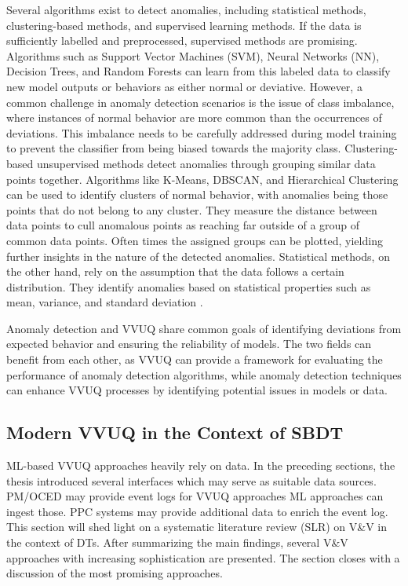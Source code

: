 Several algorithms exist to detect anomalies, including statistical methods, clustering-based methods, and supervised learning methods. If the data is sufficiently labelled and preprocessed, supervised methods are promising. Algorithms such as Support Vector Machines (SVM), Neural Networks (NN), Decision Trees, and Random Forests can learn from this labeled data to classify new model outputs or behaviors as either normal or deviative. However, a common challenge in anomaly detection scenarios is the issue of class imbalance, where instances of normal behavior are more common than the occurrences of deviations. This imbalance needs to be carefully addressed during model training to prevent the classifier from being biased towards the majority class. Clustering-based unsupervised methods detect anomalies through grouping similar data points together. Algorithms like K-Means, DBSCAN, and Hierarchical Clustering can be used to identify clusters of normal behavior, with anomalies being those points that do not belong to any cluster. They measure the distance between data points to cull anomalous points as reaching far outside of a group of common data points. Often times the assigned groups can be plotted, yielding further insights in the nature of the detected anomalies. Statistical methods, on the other hand, rely on the assumption that the data follows a certain distribution. They identify anomalies based on statistical properties such as mean, variance, and standard deviation  \parencite{chandola2009anomaly}.

Anomaly detection and VVUQ share common goals of identifying deviations from expected behavior and ensuring the reliability of models. The two fields can benefit from each other, as VVUQ can provide a framework for evaluating the performance of anomaly detection algorithms, while anomaly detection techniques can enhance VVUQ processes by identifying potential issues in models or data.

\subsection{Modern VVUQ in the Context of SBDT}
\label{sec:vvuq-dt}
ML-based VVUQ approaches heavily rely on data. In the preceding sections, the thesis introduced several interfaces which may serve as suitable data sources. PM/OCED may provide event logs for VVUQ approaches \textemdash ML approaches can ingest those. PPC systems may provide additional data to enrich the event log. This section will shed light on a systematic literature review (SLR) on V&V in the context of DTs. After summarizing the main findings, several V&V approaches with increasing sophistication are presented. The section closes with a discussion of the most promising approaches.


